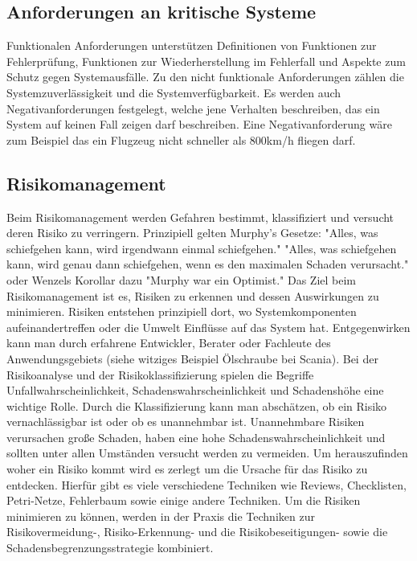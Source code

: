 \subsection{Anforderungen an kritische Systeme}
Funktionalen Anforderungen unterstützen Definitionen von  Funktionen zur Fehlerprüfung, Funktionen zur Wiederherstellung im Fehlerfall und Aspekte zum Schutz gegen Systemausfälle. Zu den nicht funktionale Anforderungen zählen die Systemzuverlässigkeit und die Systemverfügbarkeit. Es werden auch Negativanforderungen festgelegt, welche jene Verhalten beschreiben, das ein System auf keinen Fall zeigen darf beschreiben. Eine Negativanforderung wäre zum Beispiel das ein Flugzeug nicht schneller als 800km/h fliegen darf.


\subsection{Risikomanagement}
Beim Risikomanagement werden Gefahren bestimmt, klassifiziert und versucht deren Risiko zu verringern.
\linebreak
Prinzipiell gelten Murphy's Gesetze:
"Alles, was schiefgehen kann, wird irgendwann einmal schiefgehen."
"Alles, was schiefgehen kann, wird genau dann schiefgehen, wenn es den maximalen Schaden verursacht."
oder Wenzels Korollar dazu
"Murphy war ein Optimist."
\linebreak
Das Ziel beim Risikomanagement ist es, Risiken zu erkennen und dessen Auswirkungen zu minimieren. Risiken entstehen prinzipiell dort, wo Systemkomponenten aufeinandertreffen oder die Umwelt Einflüsse auf das System hat. Entgegenwirken kann man durch erfahrene Entwickler, Berater oder Fachleute des Anwendungsgebiets (siehe witziges Beispiel Ölschraube bei Scania).
\linebreak
Bei der Risikoanalyse und der Risikoklassifizierung spielen die Begriffe Unfallwahrscheinlichkeit, Schadenswahrscheinlichkeit und Schadenshöhe eine wichtige Rolle. Durch die Klassifizierung kann man  abschätzen, ob ein Risiko vernachlässigbar ist oder ob es unannehmbar ist. Unannehmbare Risiken verursachen große Schaden, haben eine hohe Schadenswahrscheinlichkeit und sollten unter allen Umständen versucht werden zu vermeiden.
\linebreak
Um herauszufinden woher ein Risiko kommt wird es zerlegt um die Ursache für das Risiko zu entdecken. Hierfür gibt es viele verschiedene Techniken wie Reviews, Checklisten, Petri-Netze, Fehlerbaum sowie einige andere Techniken.
\linebreak
Um die Risiken minimieren zu können, werden in der Praxis die Techniken zur Risikovermeidung-, Risiko-Erkennung- und die Risikobeseitigungen- sowie die Schadensbegrenzungsstrategie kombiniert.

